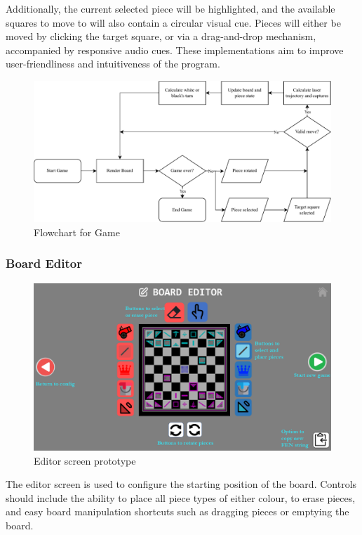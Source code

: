 \documentclass[../main/main.tex]{subfiles}
\begin{document}
Additionally, the current selected piece will be highlighted, and the available squares to move to will also contain a circular visual cue. Pieces will either be moved by clicking the target square, or via a drag-and-drop mechanism, accompanied by responsive audio cues. These implementations aim to improve user-friendliness and intuitiveness of the program.

\begin{figure}[ht!]
    \centering
    \includegraphics[width=\columnwidth]{../design/assets/game_flowchart.pdf}
    \caption{Flowchart for Game}
    \label{fig:game-flowchart}
\end{figure}

\subsubsection{Board Editor}
\begin{figure}[ht!]
    \centering
    \includegraphics[width=0.8\columnwidth]{../design/assets/editor_gui.png}
    \caption{Editor screen prototype}
    \label{fig:editor-gui}
\end{figure}

The editor screen is used to configure the starting position of the board. Controls should include the ability to place all piece types of either colour, to erase pieces, and easy board manipulation shortcuts such as dragging pieces or emptying the board.
\end{document}
